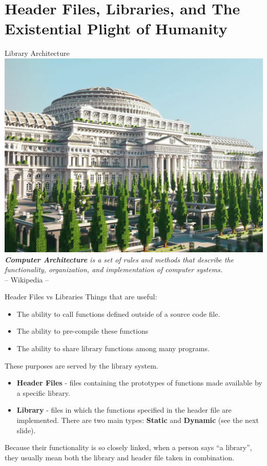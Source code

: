 \documentclass[11pt]{beamer}
\begin{document}
\section[Lib]{Header Files, Libraries, and The Existential Plight of Humanity} 
\begin{frame}{Library Architecture}
\center
\includegraphics[scale=0.17]{minecraftlibrary.png} \\
\small
\emph{\textbf{Computer Architecture} is a set of rules and methods that describe the functionality, organization, and implementation of computer systems.} \\
\vspace{-10pt}
\flushright -- Wikipedia --
\end{frame}

\begin{frame}{Header Files vs Libraries}
Things that are useful:
\begin{itemize}
\item The ability to call functions defined outside of a source code file.  
\item The ability to pre-compile these functions
\item The ability to share library functions among many programs.
\end{itemize}
These purposes are served by the library system. 
\begin{itemize}
\item \textbf{Header Files} - files containing the prototypes of functions made available by a specific library.  
\item \textbf{Library} - files in which the functions specified in the header file are implemented. There are two main types: \textbf{Static} and \textbf{Dynamic} (see the next slide).
\end{itemize}
Because their functionality is so closely linked, when a person says ``a library'', they usually mean both the library and header file taken in combination.  
\end{frame}
\end{document}
